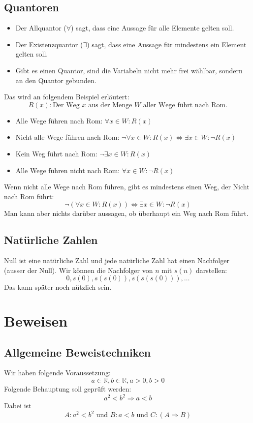 \subsection{Quantoren}
  \begin{itemize}
    \item Der Allquantor ($\forall$) sagt, dass eine Aussage für alle
      Elemente gelten soll.
    \item Der Existenzquantor ($\exists$) sagt, dass eine Aussage für
      mindestens ein Element gelten soll.
    \item Gibt es einen Quantor, sind die Variabeln nicht mehr frei wählbar,
      sondern an den Quantor gebunden.
  \end{itemize}
  Das wird an folgendem Beispiel erläutert:
  \[R(x) : \text{Der Weg } x \text{ aus der Menge } W \text{ aller Wege führt nach Rom.} \]
  \begin{itemize}
    \item Alle Wege führen nach Rom: $\forall x \in W: R(x)$
    \item Nicht alle Wege führen nach Rom: $\neg \forall x \in W: R(x)
    \Leftrightarrow \exists x \in W: \neg R(x)$
    \item Kein Weg führt nach Rom: $\neg \exists x \in W: R(x)$
    \item Alle Wege führen nicht nach Rom: $\forall x \in W: \neg R(x)$
  \end{itemize}
  Wenn nicht alle Wege nach Rom führen, gibt es mindestens einen Weg,
    der Nicht nach Rom führt:
  \[ \neg (\forall x \in W: R(x)) \Leftrightarrow \exists x \in W: \neg R(x) \]
  Man kann aber nichts darüber aussagen, ob überhaupt ein Weg nach Rom führt.

 
\subsection{Natürliche Zahlen}
  Null ist eine natürliche Zahl und jede natürliche Zahl hat einen
    Nachfolger (ausser der Null).
  Wir können die Nachfolger von $n$ mit $s(n)$ darstellen:
  \[ 0, s(0), s(s(0)), s(s(s(0))), \dots \]
  Das kann später noch nützlich sein.

\section{Beweisen}
\subsection{Allgemeine Beweistechniken}
Wir haben folgende Voraussetzung:
  \[ a \in \mathbb{R}, b \in \mathbb{R}, a > 0, b > 0 \]
  Folgende Behauptung soll geprüft werden:
  \[ a^2 < b^2 \Rightarrow a < b \]
  Dabei ist
  \[ A: a^2 < b^2 \text{ und } B: a < b \text{ und } C: (A \Rightarrow B) \]
